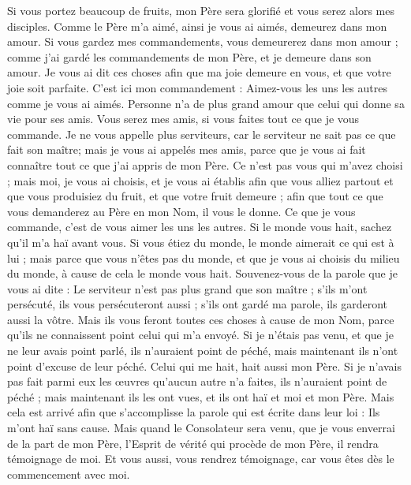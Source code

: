 \begin{multicols}{2}
Si vous portez beaucoup de fruits, mon Père sera glorifié et vous serez alors mes disciples.
Comme le Père m'a aimé, ainsi je vous ai aimés, demeurez dans mon amour.
Si vous gardez mes commandements, vous demeurerez dans mon amour ; comme j'ai gardé les commandements de mon Père, et je demeure dans son amour.
Je vous ai dit ces choses afin que ma joie demeure en vous, et que votre joie soit parfaite.
C'est ici mon commandement : Aimez-vous les uns les autres comme je vous ai aimés.
Personne n'a de plus grand amour que celui qui donne sa vie pour ses amis.
Vous serez mes amis, si vous faites tout ce que je vous commande.
Je ne vous appelle plus serviteurs, car le serviteur ne sait pas ce que fait son maître; mais je vous ai appelés mes amis, parce que je vous ai fait connaître tout ce que j'ai appris de mon Père.
Ce n'est pas vous qui m'avez choisi ; mais moi, je vous ai choisis, et je vous ai établis afin que vous alliez partout et que vous produisiez du fruit, et que votre fruit demeure ; afin que tout ce que vous demanderez au Père en mon Nom, il vous le donne.
Ce que je vous commande, c'est de vous aimer les uns les autres.
Si le monde vous hait, sachez qu'il m'a haï avant vous.
Si vous étiez du monde, le monde aimerait ce qui est à lui ; mais parce que vous n'êtes pas du monde, et que je vous ai choisis du milieu du monde, à cause de cela le monde vous hait.
Souvenez-vous de la parole que je vous ai dite : Le serviteur n'est pas plus grand que son maître ; s'ils m'ont persécuté, ils vous persécuteront aussi ; s'ils ont gardé ma parole, ils garderont aussi la vôtre.
Mais ils vous feront toutes ces choses à cause de mon Nom, parce qu'ils ne connaissent point celui qui m'a envoyé.
Si je n'étais pas venu, et que je ne leur avais point parlé, ils n'auraient point de péché, mais maintenant ils n'ont point d'excuse de leur péché.
Celui qui me hait, hait aussi mon Père.
Si je n'avais pas fait parmi eux les œuvres qu'aucun autre n'a faites, ils n'auraient point de péché ; mais maintenant ils les ont vues, et ils ont haï et moi et mon Père.
Mais cela est arrivé afin que s'accomplisse la parole qui est écrite dans leur loi : Ils m'ont haï sans cause.
Mais quand le Consolateur sera venu, que je vous enverrai de la part de mon Père, l'Esprit de vérité qui procède de mon Père, il rendra témoignage de moi.
Et vous aussi, vous rendrez témoignage, car vous êtes dès le commencement avec moi.

\end{multicols}
